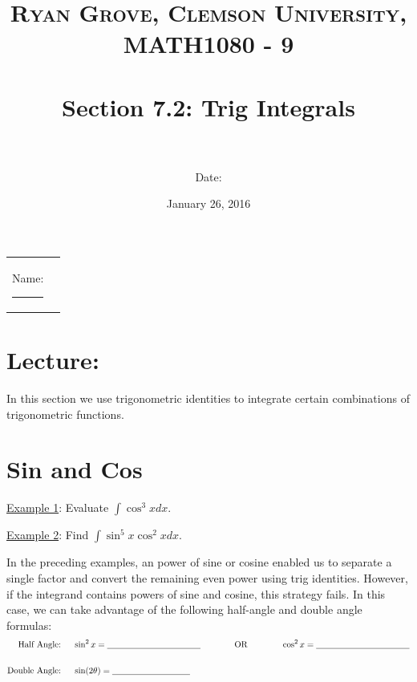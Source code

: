 \documentclass[paper=a4, fontsize=11pt]{scrartcl} %
\title{	
\normalfont \normalsize 
\textsc{Ryan Grove, Clemson University, MATH1080 - 9} \\ [25pt] %
\horrule{0.5pt} \\[0.4cm] %
\huge Section 7.2: Trig Integrals \\ %
\horrule{2pt} \\[0.5cm] %
}
\author{Date:} %
\date{\normalsize January 26, 2016} %
\numberwithin{equation}{section} %
\numberwithin{figure}{section} %
\numberwithin{table}{section} %
\newcommand{\ds}{\displaystyle}
\begin{document}
\maketitle %

\begin{flushleft}
\begin{tabular}{l l}
Name: \rule{3.2in}{.01cm}  & {}%
\end{tabular}
\end{flushleft}


\section*{\textbf{Lecture:}}

In this section we use trigonometric identities to integrate certain combinations of trigonometric functions.\\

\section*{Sin and Cos}
\indent

\underline{Example 1}: Evaluate $\ds\int \cos^3x dx$.\\
\indent

\vspace{2in}

\underline{Example 2}: Find $\ds\int \sin^5x \cos^2x dx$.\\
\indent

\vspace{4in}

In the preceding examples, an \underline{\hspace{0.5in}} power of sine or cosine enabled us to separate a single factor and convert the remaining even power using trig identities. However, if the integrand contains \underline{\hspace{0.5in}} powers of \underline{\hspace{0.5in}} sine and cosine, this strategy fails. In this case, we can take advantage of the following half-angle and double angle formulas:\\

\begin{align*}
\text{Half Angle: } \quad &\sin^2x = \underline{\hspace{1.5in}} \hspace{0.5in} \text{ OR } \hspace{0.5in} \cos^2 x =  \underline{\hspace{1.5in}}\\
\text{ } &\\
\text{Double Angle: }\quad  & \sin(2\theta) = \underline{\hspace{1.25in}}
\end{align*}
\end{document}
